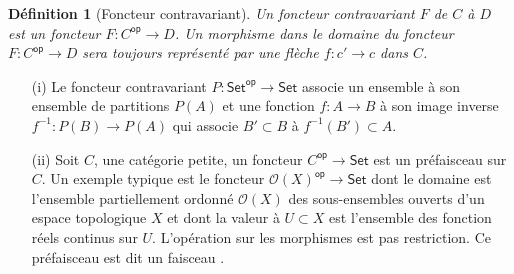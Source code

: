 \documentclass[justified]{tufte-handout}
\newtheorem{definition}{Définition}
\def\msf{\mathsf}
\def\mcf{\mathcal}
\begin{document}
\begin{definition}[Foncteur contravariant]
	Un foncteur contravariant $F$ de $C$ à $D$ est un foncteur $F : C^{\msf{op}} \rightarrow D$.
	Un morphisme dans le domaine du foncteur $F : C^{\msf{op}} \rightarrow D$ sera toujours représenté par une flèche $f : c' \rightarrow c$ dans $C$.

	\begin{center}
	\end{center}


\end{definition}

\begin{itemize}
	\item[(i)] Le foncteur contravariant $P : \msf{Set}^{\msf{op}} \rightarrow \msf{Set}$ associe un ensemble à son ensemble de partitions $P(A)$ et une fonction $f : A \rightarrow B$ à son image inverse $f^{-1} : P(B) \rightarrow P(A)$ qui associe $B' \subset B$ à $f^{-1}(B') \subset A$.
	\item[(ii)] Soit $C$, une catégorie petite, un foncteur $C^{\msf{op}} \rightarrow \msf{Set}$ est un \flqq{} préfaisceau \frqq{} sur $C$.
		Un exemple typique est le foncteur $\mcf{O}(X)^\msf{op} \rightarrow \msf{Set}$ dont le domaine est l'ensemble partiellement ordonné $\mcf{O}(X)$ des sous-ensembles ouverts d'un espace topologique $X$ et dont la valeur à $U \subset X$ est l'ensemble des fonction réels continus sur $U$.
		L'opération sur les morphismes est pas restriction.
		Ce préfaisceau est dit un \flqq{} faisceau \frqq{}.
\end{itemize}
\end{document}
